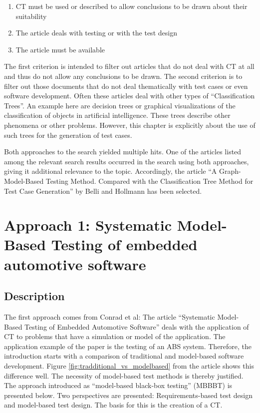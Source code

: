 \begin{enumerate}
\item CT must be used or described to allow conclusions to be drawn about their suitability
\item The article deals with testing or with the test design
\item The article must be available
\end{enumerate}

The first criterion is intended to filter out articles that do not deal with CT at all and thus do not allow any conclusions to be drawn. The second criterion is to filter out those documents that do not deal thematically with test cases or even software development. Often these articles deal with other types of \enquote{Classification Trees}. An example here are decision trees or graphical visualizations of the classification of objects in artificial intelligence. These trees describe other phenomena or  other problems. However, this chapter is explicitly about the use of such trees for the generation of test cases.

Both approaches to the search yielded multiple hits. One of the articles listed among the relevant search results occurred in the search using both approaches, giving it additional relevance to the topic. Accordingly, the article \enquote{A Graph-Model-Based Testing Method. Compared with the Classification Tree Method for Test Case Generation} by Belli and Hollmann\cite{Belli} has been selected.

\pagebreak

\section{Approach 1: Systematic Model-Based Testing of embedded automotive software}
\label{Kap:Approach1}

\subsection{Description}

The first approach comes from Conrad et al\cite{Conrad}: The article \enquote{Systematic Model-Based Testing of Embedded Automotive Software} deals with the application of CT to problems that have a simulation or model of the application. The application example of the paper is the testing of an ABS system. Therefore, the introduction starts with a comparison of traditional and model-based software development. Figure \ref{fig:tradditional_vs_modelbased} from the article shows this difference well. The necessity of model-based test methods is thereby justified. The approach introduced as \enquote{model-based black-box testing} (MBBBT) is presented below. Two perspectives are presented: Requirements-based test design and model-based test design. The basis for this is the creation of a CT.

